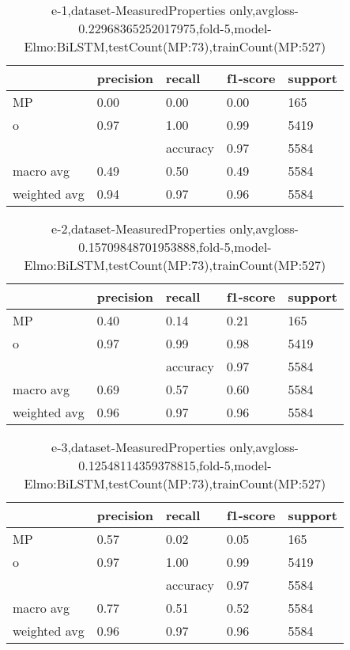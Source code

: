 \begin{table}[!ht] 
\centering
\caption{e-1,dataset-MeasuredProperties only,avgloss-0.22968365252017975,fold-5,model-Elmo:BiLSTM,testCount(MP:73),trainCount(MP:527)}\label{e-1data-mpS.tsv}
\begin{tabularx}{300pt}{|X|X|X|X|X|}
\hline
&precision&recall&f1-score&support\\
\hline
MP&0.00&0.00&0.00&165\\
\hline
o&0.97&1.00&0.99&5419\\
\hline
&&accuracy&0.97&5584\\
\hline
macro avg&0.49&0.50&0.49&5584\\
\hline
weighted avg&0.94&0.97&0.96&5584\\
\hline
\end{tabularx}
\end{table}
\begin{table}[!ht] 
\centering
\caption{e-2,dataset-MeasuredProperties only,avgloss-0.15709848701953888,fold-5,model-Elmo:BiLSTM,testCount(MP:73),trainCount(MP:527)}\label{e-2data-mpS.tsv}
\begin{tabularx}{300pt}{|X|X|X|X|X|}
\hline
&precision&recall&f1-score&support\\
\hline
MP&0.40&0.14&0.21&165\\
\hline
o&0.97&0.99&0.98&5419\\
\hline
&&accuracy&0.97&5584\\
\hline
macro avg&0.69&0.57&0.60&5584\\
\hline
weighted avg&0.96&0.97&0.96&5584\\
\hline
\end{tabularx}
\end{table}
\begin{table}[!ht] 
\centering
\caption{e-3,dataset-MeasuredProperties only,avgloss-0.12548114359378815,fold-5,model-Elmo:BiLSTM,testCount(MP:73),trainCount(MP:527)}\label{e-3data-mpS.tsv}
\begin{tabularx}{300pt}{|X|X|X|X|X|}
\hline
&precision&recall&f1-score&support\\
\hline
MP&0.57&0.02&0.05&165\\
\hline
o&0.97&1.00&0.99&5419\\
\hline
&&accuracy&0.97&5584\\
\hline
macro avg&0.77&0.51&0.52&5584\\
\hline
weighted avg&0.96&0.97&0.96&5584\\
\hline
\end{tabularx}
\end{table}
